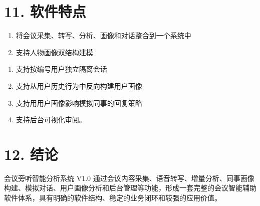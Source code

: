 \documentclass[12pt,a4paper]{article}
\begin{document}
\section*{11. 软件特点}
\vspace{0.45em}
\begin{enumerate}
\item 将会议采集、转写、分析、画像和对话整合到一个系统中
\item 支持人物画像双结构建模
\end{enumerate}
\newpage
{}
\fancyhead[R]{}
\begin{enumerate}
\item 支持按编号用户独立隔离会话
\item 支持从用户历史行为中反向构建用户画像
\item 支持用用户画像影响模拟同事的回复策略
\item 支持后台可视化审阅。
\end{enumerate}
\vspace{0.45em}
\section*{12. 结论}
\vspace{0.45em}
会议旁听智能分析系统 V1.0 通过会议内容采集、语音转写、增量分析、同事画像构建、模拟对话、用户画像分析和后台管理等功能，形成一套完整的会议智能辅助软件体系，具有明确的软件结构、稳定的业务闭环和较强的应用价值。\par
\vspace{0.45em}
\vspace{0.45em}
\vspace{0.45em}
\vspace{0.45em}
\vspace{0.45em}
\vspace{0.45em}
\vspace{0.45em}
\vspace{0.45em}
\vspace{0.45em}
\vspace{0.45em}
\vspace{0.45em}
\vspace{0.45em}
\vspace{0.45em}
\vspace{0.45em}
\vspace{0.45em}
\vspace{0.45em}
\vspace{0.45em}
\vspace{0.45em}
\vspace{0.45em}
\vspace{0.45em}
\vspace{0.45em}
\vspace{0.45em}
\end{document}
